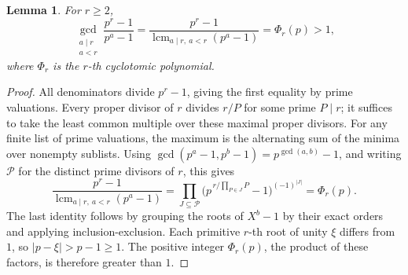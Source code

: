 \documentclass[11pt]{article}
\newtheorem{lemma}[theorem]{Lemma}
\theoremstyle{definition}
\theoremstyle{remark}
\DeclareMathOperator{\lcm}{lcm}
\numberwithin{equation}{section}
\begin{document}
\begin{lemma}\label{lem:cyclotomic-divisor}
For \(r\ge2\),
\begin{equation}\label{eq:cyclotomic-divisor}
 \gcd_{\substack{a\mid r\\a<r}}\frac{p^r-1}{p^a-1}
 =\frac{p^r-1}{\lcm_{a\mid r,\ a<r}(p^a-1)}
 =\Phi_r(p)>1,
\end{equation}
where \(\Phi_r\) is the \(r\)-th cyclotomic polynomial.
\end{lemma}
\begin{proof}
All denominators divide \(p^r-1\), giving the first equality by prime
valuations. Every proper divisor of \(r\) divides \(r/P\) for some
prime \(P\mid r\); it suffices to take the least common multiple over
these maximal proper divisors.
For any finite list of prime valuations, the maximum is the
alternating sum of the minima over nonempty sublists. Using
\(\gcd(p^a-1,p^b-1)=p^{\gcd(a,b)}-1\), and writing
\(\mathcal P\) for the distinct prime divisors of \(r\), this gives
\[
 \frac{p^r-1}{\lcm_{a\mid r,\ a<r}(p^a-1)}
 =\prod_{J\subseteq\mathcal P}
       \bigl(p^{\,r/\prod_{P\in J}P}-1\bigr)^{(-1)^{|J|}}
 =\Phi_r(p).
\]
The last identity follows by grouping the roots of \(X^b-1\) by
their exact orders and applying inclusion-exclusion.
Each primitive \(r\)-th root of unity \(\xi\) differs from \(1\), so
\(|p-\xi|>p-1\ge1\). The positive integer \(\Phi_r(p)\), the product
of these factors, is therefore greater than \(1\).
\end{proof}
\end{document}
